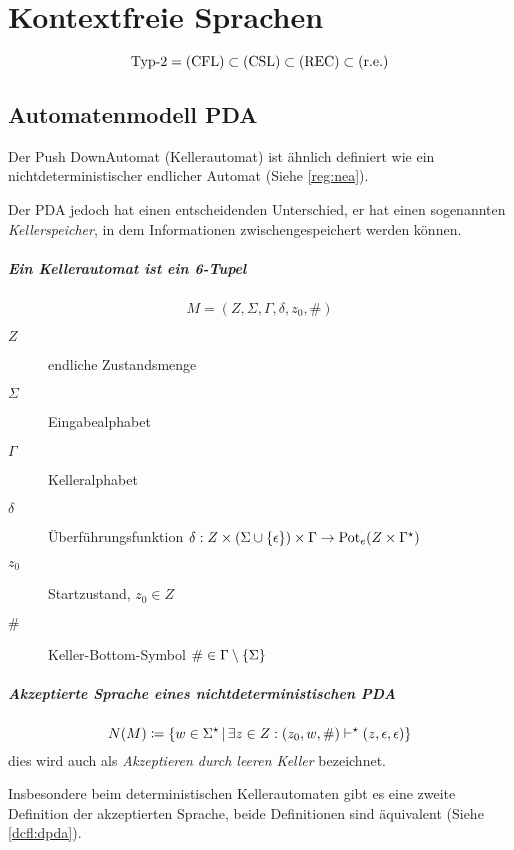 \chapter{Kontextfreie Sprachen}
\begin{equation*}
	\text{Typ-2} = \mathrm{(CFL)}\subset\mathrm{(CSL)}\subset\mathrm{(REC)}\subset\mathrm{(r.e.)}
\end{equation*}
\section{Automatenmodell PDA}\label{cfl:pda}
Der Push DownAutomat (Kellerautomat) ist ähnlich definiert wie ein nichtdeterministischer endlicher Automat (Siehe \autoref{reg:nea}).

Der PDA jedoch hat einen entscheidenden Unterschied, er hat einen sogenannten \emph{Kellerspeicher}, in dem Informationen zwischengespeichert werden können.

\paragraph{Ein Kellerautomat ist ein 6-Tupel}
\begin{equation*}
	M=(Z,\Sigma,\Gamma,\delta,z_0,\#)
\end{equation*}
\begin{description}
	\item[$Z$] endliche Zustandsmenge
	\item[$\Sigma$] Eingabealphabet
	\item[$\Gamma$] Kelleralphabet
	\item[$\delta$] Überführungsfunktion $\delta:Z\times(\Sigma\cup\left\{ \epsilon \right\})\times\Gamma\rightarrow \mathrm{Pot}_e(Z\times\Gamma^\star)$
	\item[$z_0$] Startzustand, $z_0\in Z$
	\item[$\#$] Keller-Bottom-Symbol $\#\in \Gamma\setminus\left\{ \Sigma \right\}$
\end{description}

\paragraph{Akzeptierte Sprache eines nichtdeterministischen PDA}
\begin{equation*}
	N(M)\coloneqq\left\{ w\in \Sigma^\star \,\middle|\, \exists z\in Z: (z_0, w, \#)\vdash^\star (z,\epsilon,\epsilon) \right\}
\end{equation*}
dies wird auch als \emph{Akzeptieren durch leeren Keller} bezeichnet.

Insbesondere beim deterministischen Kellerautomaten gibt es eine zweite Definition der akzeptierten Sprache, beide Definitionen sind äquivalent (Siehe \autoref{dcfl:dpda}).

